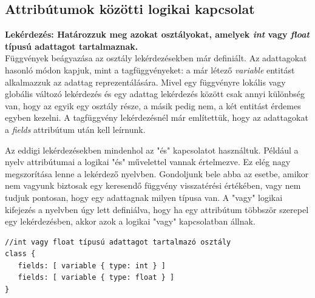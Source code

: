 \documentclass[a4paper,12pt]{report}
\begin{document}
\subsection{Attribútumok közötti logikai kapcsolat}
\textbf{Lekérdezés: Határozzuk meg azokat osztályokat, amelyek \textit{int} vagy \textit{float} típusú adattagot tartalmaznak.}
\\
Függvények beágyazása az osztály lekérdezésekben már definiált. Az adattagokat hasonló módon kapjuk, mint a tagfüggvényeket: a már létező \textit{variable} entitást alkalmazzuk az adattag reprezentálására. Mivel egy függvényre lokális vagy globális változó lekérdezés és egy adattag lekérdezés között csak annyi különbség van, hogy az egyik egy osztály része, a másik pedig nem, a két entitást érdemes egyben kezelni. A tagfüggvény lekérdezésnél már említettük, hogy az adattagokat a \textit{fields} attribútum után kell leírnunk.
\par Az eddigi lekérdezésekben mindenhol az "és" kapcsolatot használtuk. Például a nyelv attribútumai a logikai "és" művelettel vannak értelmezve. Ez elég nagy megszorítása lenne a lekérdező nyelvben. Gondoljunk bele abba az esetbe, amikor nem vagyunk biztosak egy keresendő függvény visszatérési értékében, vagy nem tudjuk pontosan, hogy egy adattagnak milyen típusa van. A "vagy" logikai kifejezés a nyelvben úgy lett definiálva, hogy ha egy attribútum többször szerepel egy lekérdezésben, akkor azok a logikai "vagy" kapcsolatban állnak.
\begin{verbatim}
//int vagy float típusú adattagot tartalmazó osztály
class {
   fields: [ variable { type: int } ]
   fields: [ variable { type: float } ]
}
\end{verbatim}
\end{document}
